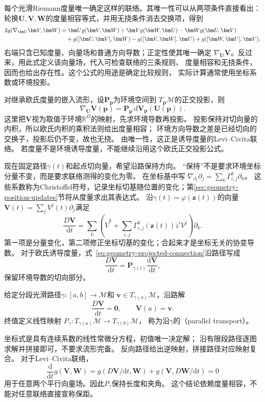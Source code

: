 每个光滑Riemann度量唯一确定这样的联络。其唯一性可以从两项条件直接看出：
轮换$\bm U,\bm V,\bm W$的度量相容等式，并用无挠条件消去交换项，得到
\begin{align}
 2g(\nabla_{\bm U}\bm V,\bm W)
 &=\bm U g(\bm V,\bm W)+\bm V g(\bm W,\bm U)
   -\bm W g(\bm U,\bm V)\notag\\
 &\quad+g([\bm U,\bm V],\bm W)-g([\bm V,\bm W],\bm U)
   +g([\bm W,\bm U],\bm V).
 \label{eq:geometry-koszul-formula}
\end{align}
右端只含已知度量、向量场和普通方向导数；正定性使其唯一确定
$\nabla_{\bm U}\bm V$。反过来，用此式定义该向量场，代入可检查联络的三条规则、
度量相容和无挠条件，因而也给出存在性。这个公式的用途是确定比较规则，
实际计算通常使用坐标系数或环境投影。

对继承欧氏度量的嵌入流形，设$\bm P_{\bm p}$为环境空间到
$T_{\bm p}\mathcal M$的正交投影，则
\begin{equation}
 \nabla_{\bm U}\bm V(\bm p)
 =\bm P_{\bm p}\,\mathrm d\bm V_{\bm p}(\bm U(\bm p)).
 \label{eq:geometry-projected-connection}
\end{equation}
这里把$\bm V$视为取值于环境$\mathbb R^D$的映射，先求环境导数再投影。
投影保持对切向量的内积，所以欧氏内积的乘积法则给出度量相容；
环境方向导数之差是已经切向的交换子，投影后仍不变，故也无挠。
由唯一性，这正是诱导度量的Levi--Civita联络。
若度量不是环境诱导度量，不能继续沿用这个欧氏正交投影公式。


现在固定路径$\gamma(t)$和起点切向量，希望沿路保持方向。
“保持”不是要求环境坐标分量不变，而是要求联络测得的变化为零。
在坐标基中写
$\nabla_{\partial_i}\partial_j=\sum_k\Gamma^k_{i,j}\partial_k$。
这些系数称为Christoffel符号，记录坐标切基随位置的变化；第\ref{sec:geometry-position-updates}节将从度量求出其表达式。
沿$\gamma(t)=\varphi(\bm z(t))$的向量
$\bm V(t)=\sum_jV^j(t)\partial_j$满足
\begin{equation}
 \frac{D\bm V}{\mathrm dt}
 =\sum_k\left(\dot V^k+
     \sum_{i,j}\Gamma^k_{i,j}(\bm z(t))\dot z^iV^j\right)\partial_k.
 \label{eq:geometry-covariant-derivative-along-path}
\end{equation}
第一项是分量变化，第二项修正坐标切基的变化；合起来才是坐标无关的协变导数。
对于欧氏诱导度量，式~\eqref{eq:geometry-projected-connection}沿路径写成
\[
 \frac{D\bm V}{\mathrm dt}
 =\bm P_{\gamma(t)}\frac{\mathrm d\bm V}{\mathrm dt},
\]
保留环境导数的切向部分。

\begin{definition}[平行移动]
\label{def:geometry-parallel-transport}
给定分段光滑路径$\gamma:[a,b]\to\mathcal M$和
$\bm v\in T_{\gamma(a)}\mathcal M$，沿路解
\[
 \frac{D\bm V}{\mathrm dt}=\bm0,\qquad \bm V(a)=\bm v.
\]
终值定义线性映射
$P_\gamma:T_{\gamma(a)}\mathcal M\to T_{\gamma(b)}\mathcal M$，
称为沿$\gamma$的（parallel transport）。
\end{definition}
坐标式是具有连续系数的线性常微分方程，初值唯一决定解；
沿有限段路径逐图求解并拼接即可，不要求流形完备。
反向路径给出逆映射，拼接路径对应映射复合。
对于Levi--Civita联络，
\[
 \frac{\mathrm d}{\mathrm dt}g(\bm V,\bm W)
 =g(D\bm V/\mathrm dt,\bm W)+g(\bm V,D\bm W/\mathrm dt)=0
\]
用于任意两个平行向量场。因此$P_\gamma$保持长度和夹角。
这个结论依赖度量相容，不能对任意联络直接宣称保距。

